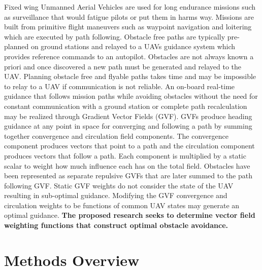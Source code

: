 \documentclass[numbered,pdftex]{ohio-etd}
\begin{document}
 Fixed wing Unmanned Aerial Vehicles are used for long endurance missions such as surveillance that would fatigue pilots or  put them in harms way.  Missions are built from primitive flight maneuvers such as waypoint navigation and loitering which are executed by path following. Obstacle free paths are typically pre-planned on ground stations and relayed to a UAVs guidance system which provides reference commands to an autopilot.  Obstacles are not always known a priori and once discovered a new path must be generated and relayed to the UAV.  Planning obstacle free and flyable paths takes time and may be impossible to relay to a UAV if communication is not reliable.  An on-board real-time guidance that follows mission paths while avoiding obstacles without the need for constant communication with a ground station or complete path recalculation may be realized through Gradient Vector Fields (GVF). GVFs produce heading guidance at any point in space for converging and following a path by summing together convergence and circulation field components. The convergence component produces vectors that point to a path and the circulation component produces vectors that follow a path. Each component is multiplied by a static scalar to weight how much influence each has on the total field. Obstacles have been represented as separate repulsive GVFs that are later summed to the path following GVF. Static GVF weights do not consider the state of the UAV resulting in sub-optimal guidance. Modifying the GVF convergence and circulation weights to be functions of common UAV states may generate an optimal guidance. \textbf{The proposed research seeks to determine vector field weighting functions that construct optimal obstacle avoidance.}

\section{Methods Overview}
\end{document}
